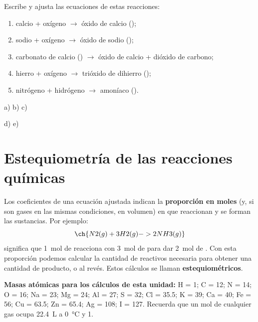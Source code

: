 \begin{exercise}
    Escribe y ajusta las ecuaciones de estas reacciones:
    \begin{enumerate}[label=\alph*)]
        \item calcio + oxígeno \(\to\) óxido de calcio ();
        \item sodio + oxígeno \(\to\) óxido de sodio ();
        \item carbonato de calcio () \(\to\) óxido de calcio + dióxido de carbono;
        \item hierro + oxígeno \(\to\) trióxido de dihierro ();
        \item nitrógeno + hidrógeno \(\to\) amoníaco ().
    \end{enumerate}
    \begin{solu}
        a) 
        \quad b) 
        \quad c) 

        d) 
        \quad e) 
    \end{solu}
\end{exercise}

\section{Estequiometría de las reacciones químicas}

Los coeficientes de una ecuación ajustada indican la \textbf{proporción en moles} (y, si son gases en las mismas condiciones, en volumen) en que reaccionan y se forman las sustancias. Por ejemplo:
\[ \ch{N2 (g) + 3 H2 (g) -> 2 NH3 (g)} \]
significa que \qty{1}{\mol} de  reacciona con \qty{3}{\mol} de  para dar \qty{2}{\mol} de . Con esta proporción podemos calcular la cantidad de reactivos necesaria para obtener una cantidad de producto, o al revés. Estos cálculos se llaman \textbf{estequiométricos}.

\begin{remark}
    \textbf{Masas atómicas para los cálculos de esta unidad:} H = 1; C = 12; N = 14; O = 16; Na = 23; Mg = 24; Al = 27; S = 32; Cl = \num{35.5}; K = 39; Ca = 40; Fe = 56; Cu = \num{63.5}; Zn = \num{65.4}; Ag = 108; I = 127. Recuerda que un mol de cualquier gas ocupa \qty{22.4}{\L} a \qty{0}{\celsius} y \qty{1}{\atm}.
\end{remark}


